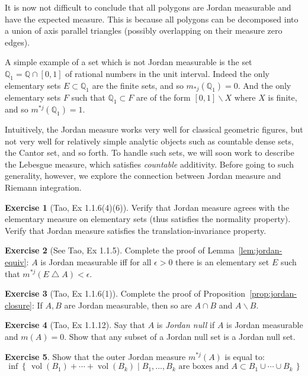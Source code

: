 \documentclass[11pt,oneside]{amsbook}
\newcommand{\set}[1]{\left\{\,#1\,\right\}}
\renewcommand{\setminus}{\smallsetminus}
\renewcommand{\triangle}{\bigtriangleup}
\newcommand{\QQ}{{\mathbb Q}}
\DeclareMathOperator{\vol}{vol}
\theoremstyle{definition}
\newtheorem{exerc}{Exercise}[section]
\theoremstyle{plain}
\theoremstyle{definition}
\theoremstyle{remark}
\numberwithin{equation}{section}
\numberwithin{figure}{section}
\begin{document}
It is now not difficult to conclude that all polygons are Jordan measurable and have the expected measure. This is because all polygons can be decomposed into a union of axis parallel triangles (possibly overlapping on their measure zero edges).

A simple example of a set which is not Jordan measurable is the set $\QQ_1=\QQ\cap[0,1]$ of rational numbers in the unit interval. Indeed the only elementary sets $E\subset\QQ_1$ are the finite sets, and so $m_{*j}(\QQ_1)=0$. And the only elementary sets $F$ such that $\QQ_1\subset F$ are of the form $[0,1]\setminus X$ where $X$ is finite, and so $m^{*j}(\QQ_1)=1$.

Intuitively, the Jordan measure works very well for classical geometric figures, but not very well for relatively simple analytic objects such as countable dense sets, the Cantor set, and so forth. To handle such sets, we will soon work to describe the Lebesgue measure, which satisfies \emph{countable} additivity. Before going to such generality, however, we explore the connection between Jordan measure and Riemann integration.

\begin{exerc}[Tao, Ex 1.1.6(4)(6)]
  Verify that Jordan measure agrees with the elementary measure on elementary sets (thus satisfies the normality property). Verify that Jordan measure satisfies the translation-invariance property.
\end{exerc}

\begin{exerc}[See Tao, Ex 1.1.5]
  Complete the proof of Lemma~\ref{lem:jordan-equiv}: $A$ is Jordan measurable iff for all $\epsilon>0$ there is an elementary set $E$ such that $m^{*j}(E\triangle A)<\epsilon$.
\end{exerc}

\begin{exerc}[Tao, Ex 1.1.6(1)]
  Complete the proof of Proposition~\ref{prop:jordan-closure}: If $A,B$ are Jordan measurable, then so are $A\cap B$ and $A\setminus B$.
\end{exerc}

\begin{exerc}[Tao, Ex 1.1.12]
  Say that $A$ is \emph{Jordan null} if $A$ is Jordan measurable and $m(A)=0$. Show that any subset of a Jordan null set is a Jordan null set.
\end{exerc}

\begin{exerc}
  Show that the outer Jordan measure $m^{*j}(A)$ is equal to:
  \[\inf\set{\vol(B_1)+\cdots+\vol(B_k)\mid B_1,\ldots,B_k\text{ are boxes and }A\subset B_1\cup\cdots\cup B_k}
  \]
\end{exerc}
\end{document}
